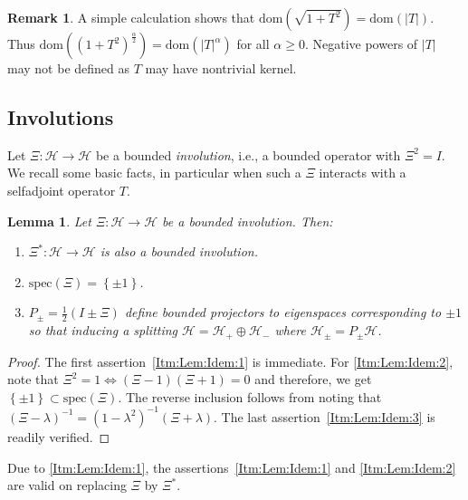 \documentclass[a4paper,10pt,reqno]{amsart}
\newcommand{\spec}{\mathrm{spec}}%
\newcommand{\dbrac}[1]{\left\{#1\right\}}
\newcommand{\modulus}[1]{|#1|}
\newcommand{\set}[1]{\dbrac{#1}}
\newcommand{\Hil}{\mathscr{H}}
\newcommand{\dom}{\mathrm{dom}}
\newtheorem{lemma}[theorem]{Lemma}
\theoremstyle{definition}
\newtheorem{remark}[theorem]{Remark}
\begin{document}
\begin{remark}
A simple calculation shows that $\dom(\sqrt{1 + T^2}) = \dom(\modulus{T})$.
Thus $\dom( (1+ T^2)^{\frac {\alpha}{2}}) = \dom(\modulus{T}^\alpha)$ for all $\alpha \ge0$.
Negative powers of $|T|$ may not be defined as $T$ may have nontrivial kernel.
\end{remark}


\subsection{Involutions} 
Let $\Xi:\Hil \to \Hil$ be a bounded \emph{involution}, i.e., a bounded operator with $\Xi^2 = I$.
We recall some basic facts, in particular when such a $\Xi$ interacts with a selfadjoint operator $T$.

\begin{lemma}
\label{Lem:Idem}
Let $\Xi: \Hil \to \Hil$ be a bounded involution. Then:
\begin{enumerate}[label=(\roman*), labelwidth=0pt, labelindent=2pt, leftmargin=21pt]
\item \label{Itm:Lem:Idem:1}
      $\Xi^\ast:\Hil \to \Hil$ is also a bounded involution.
\item  \label{Itm:Lem:Idem:2}
      $\spec(\Xi) = \set{\pm 1}$.
      \item\label{Itm:Lem:Idem:3}
      $P_{\pm}= \frac12 (I \pm \Xi)$ define bounded projectors to eigenspaces corresponding to $\pm 1$ so that inducing a splitting $\Hil = \Hil_+ \oplus \Hil_-$ where $\Hil_{\pm} = P_{\pm} \Hil$.
\end{enumerate}
\end{lemma}
\begin{proof}
The first assertion~\ref{Itm:Lem:Idem:1} is immediate.
For \ref{Itm:Lem:Idem:2}, note that $\Xi^2 = 1 \iff (\Xi - 1)(\Xi +1) =0$ and therefore, we get $\set{\pm 1} \subset \spec(\Xi)$.
The reverse inclusion follows from noting that $(\Xi - \lambda)^{-1} = (1 - \lambda^2)^{-1}(\Xi + \lambda)$.
The last assertion~\ref{Itm:Lem:Idem:3} is readily verified.
\end{proof}


Due to \ref{Itm:Lem:Idem:1}, the assertions~\ref{Itm:Lem:Idem:1} and \ref{Itm:Lem:Idem:2} are valid on replacing $\Xi$ by  $\Xi^*$.
\end{document}
